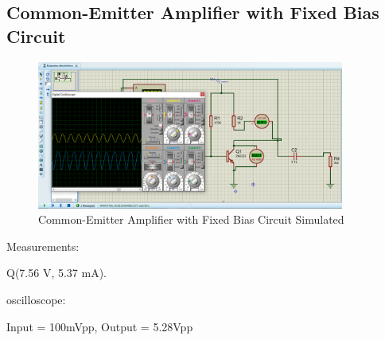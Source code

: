 \subsection{Common-Emitter Amplifier with Fixed Bias Circuit}

\begin{figure}[h]
    \centering
    \includegraphics[width = 0.9\textwidth]{Imagenes/Imagenes_Juan/Circuito1_Simulado.PNG}
    \caption{Common-Emitter Amplifier with Fixed Bias Circuit Simulated}
    \label{circuit1Simulated}
\end{figure}

Measurements:
\begin{center}
    Q(7.56 V, 5.37 mA).
    
\end{center}
oscilloscope:

\begin{center}
    Input = 100mVpp, Output = 5.28Vpp
\end{center}